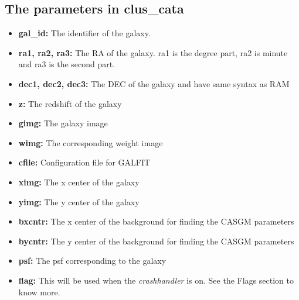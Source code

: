 \documentclass[a4paper,12pt]{article}
\begin{document}
\subsection{The parameters in clus\_cata}
\label{cluscat}
\begin{itemize}
\item \textbf{ gal\_id:} The identifier of the galaxy.
\item \textbf{ ra1, ra2, ra3:} The RA of the galaxy. ra1 is the degree part, ra2 is minute and ra3
 is the second part.
\item \textbf{ dec1, dec2, dec3:} The DEC of the galaxy and have same syntax as RAM
\item \textbf{ z:} The redshift of the galaxy
\item \textbf{ gimg:} The galaxy image
\item \textbf{ wimg:} The corresponding weight image
\item \textbf{ cfile:} Configuration file for GALFIT
\item \textbf{ ximg:} The x center of the galaxy
\item \textbf{ yimg:} The y center of the galaxy
\item \textbf{ bxcntr:} The x center of the background for finding the CASGM parameters
\item \textbf{ bycntr:} The y center of the background for finding the CASGM parameters
\item \textbf{ psf:} The psf corresponding to the galaxy
\item \textbf{ flag:} This will be used when the\textit{ crashhandler} is on. See the Flags section to know more.
\end{itemize}
\end{document}
